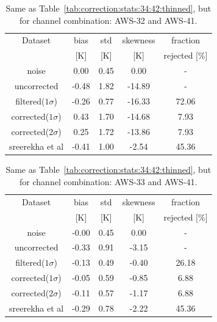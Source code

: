 \documentclass[12pt]{article}
\begin{document}
\begin{table}[!p]
	\centering
	\begin{tabular}[b]{c|c|c|c|c}
		Dataset  		  &   bias &   std & skewness & fraction \\
							&   [K]  &   [K] & [K] & rejected [\%]\\
		\hline
noise             		&   0.00 &  0.45 &               0.00 &                - \\
uncorrected       		&  -0.48 &  1.82 &             -14.89 &                - \\
filtered($1\sigma$)  	&  -0.26 &  0.77 &             -16.33 &               72.06 \\
corrected($1\sigma$) 	&   0.43 &  1.70 &             -14.68 &                7.93 \\
corrected($2\sigma$) 	&   0.25 &  1.72 &             -13.86 &                7.93 \\
sreerekha et al   		&  -0.41 &  1.00 &              -2.54 &               45.36 \\
		\hline
	\end{tabular}
	\caption{Same as Table~\ref{tab:correction:stats:34:42:thinned}, but for channel combination: AWS-32 and AWS-41.   }
	\label{tab:correction:stats:32:41}
\end{table}

\begin{table}[!p]
	\centering
	\begin{tabular}[b]{c|c|c|c|c}
		Dataset  		  &   bias &   std &  skewness  & fraction\\
						&   [K]  &   [K] & [K]  & rejected [\%]\\
		\hline
	noise       	    	&  -0.00 &  0.45 &               0.00 &               - \\
	uncorrected	    		&  -0.33 &  0.91 &              -3.15 &                - \\
	filtered($1\sigma$)  	&  -0.13 &  0.49 &              -0.40 &               26.18 \\
	corrected($1\sigma$) 	&  -0.05 &  0.59 &              -0.85 &                6.88 \\
	corrected($2\sigma$) 	&  -0.11 &  0.57 &              -1.17 &                6.88 \\
	sreerekha et al   		&  -0.29 &  0.78 &              -2.22 &               45.36 \\
		\hline
	\end{tabular}
	\caption{Same as Table~\ref{tab:correction:stats:34:42:thinned}, but for channel combination: AWS-33 and AWS-41.   }
	\label{tab:correction:stats:33:41}
\end{table}
\end{document}
